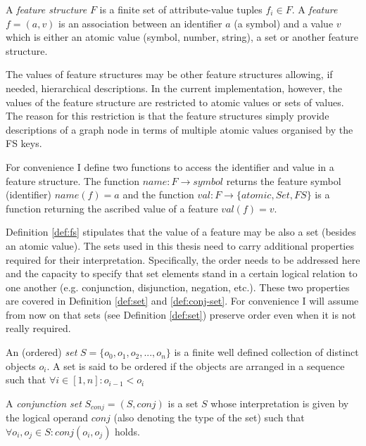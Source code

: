     \begin{definition}\label{def:fs}
    	A \textit{feature structure} $F$ is a finite set of attribute-value tuples $f_{i} \in F$. A \textit{feature} $f=(a,v)$ is an association between an identifier $a$ (a symbol) and a value $v$ which is either an atomic value (symbol, number, string), a set or another feature structure. 
    \end{definition}

    The values of feature structures may be other feature structures allowing, if needed, hierarchical descriptions. In the current implementation, however, the values of the feature structure are restricted to atomic values or sets of values. The reason for this restriction is that the feature structures simply provide descriptions of a graph node in terms of multiple atomic values organised by the FS keys. 

    For convenience I define two functions to access the identifier and value in a feature structure. The function $name:F \rightarrow symbol$ returns the feature symbol (identifier) $name(f)=a$ and the function $val:F \rightarrow \{atomic, Set, FS\}$ is a function returning the ascribed value of a feature $val(f)=v$. 

    Definition \ref{def:fs} stipulates that the value of a feature may be also a set (besides an atomic value). The sets used in this thesis need to carry additional properties required for their interpretation. Specifically, the order needs to be addressed here and the capacity to specify that set elements stand in a certain logical relation to one another (e.g. conjunction, disjunction, negation, etc.). These two properties are covered in Definition \ref{def:set} and \ref{def:conj-set}. For convenience I will assume from now on that sets (see Definition \ref{def:set}) preserve order even when it is not really required.  

    \begin{definition}[Set]\label{def:set}
    	An (ordered) \textit{set} $S=\{o_0,o_1,o_2,...,o_n\}$ is a finite well defined collection of distinct objects $o_{i}$. A set is said to be ordered if the objects are arranged in a sequence such that $\forall i \in [1,n]: o_{i-1}<o_{i}$
    \end{definition}

    \begin{definition}\label{def:conj-set}
    	A \textit{conjunction set} $S_{conj}=(S,conj)$ is a set $S$ whose interpretation is given by the logical operand $conj$ (also denoting the type of the set) such that $\forall o_{i},o_{j} \in S: conj(o_{i}, o_{j})$ holds.
    \end{definition}

